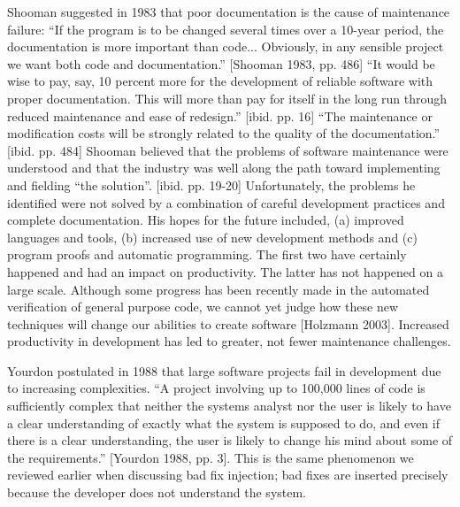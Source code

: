 Shooman suggested in 1983 that poor documentation is the cause of maintenance failure: ``If the program is to be changed several times over a 10-year period, the documentation is more important than code... Obviously, in any sensible project we want both code and documentation.'' [Shooman 1983, pp. 486] ``It would be wise to pay, say, 10 percent more for the development of reliable software with proper documentation.  This will more than pay for itself in the long run through reduced maintenance and ease of redesign.'' [ibid. pp. 16]  ``The maintenance or modification costs will be strongly related to the quality of the documentation.'' [ibid. pp. 484] Shooman believed that the problems of software maintenance were understood and that the industry was well along the path toward implementing and fielding ``the solution''.  [ibid. pp. 19-20]  Unfortunately, the problems he identified were not solved by a combination of careful development practices and complete documentation.  His hopes for the future included, (a) improved languages and tools, (b) increased use of new development methods and (c) program proofs and automatic programming.  The first two have certainly happened and had an impact on productivity.  The latter has not happened on a large scale.  Although some progress has been recently made in the automated verification of general purpose code, we cannot yet judge how these new techniques will change our abilities to create software [Holzmann 2003].  Increased productivity in development has led to greater, not fewer maintenance challenges.

Yourdon postulated in 1988 that large software projects fail in development due to increasing complexities. ``A project involving up to 100,000 lines of code is sufficiently complex that neither the systems analyst nor the user is likely to have a clear understanding of exactly what the system is supposed to do, and even if there is a clear understanding, the user is likely to change his mind about some of the requirements.'' [Yourdon 1988, pp. 3].  This is the same phenomenon we reviewed earlier when discussing bad fix injection; bad fixes are inserted precisely because the developer does not understand the system.

